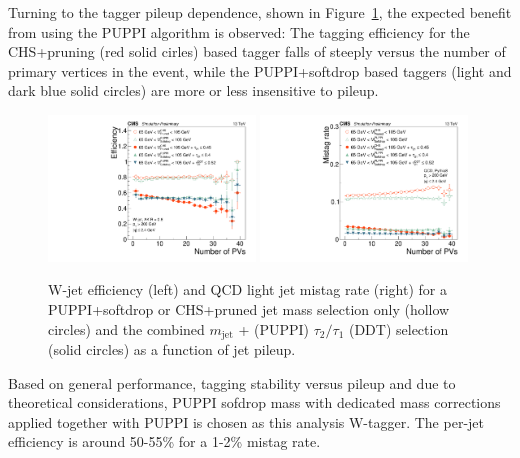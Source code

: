 Turning to the tagger pileup dependence, shown in Figure~\ref{fig:searchII:effvspu}, the expected benefit from using the PUPPI algorithm is observed: The tagging efficiency for the CHS+pruning (red solid cirles) based tagger falls of steeply versus the number of primary vertices in the event, while the PUPPI+softdrop based taggers (light and dark blue solid circles) are more or less insensitive to pileup.
\begin{figure}[h!]
\centering
\includegraphics[width=0.49\textwidth]{figures/vtagging/JME-16-003/BoostedW/WtagSigEffvsNPV.pdf}
\includegraphics[width=0.49\textwidth]{figures/vtagging/JME-16-003/BoostedW/QCDBkgEffvsNPV.pdf}
\caption{W-jet efficiency (left) and QCD light jet mistag rate (right) for a PUPPI+softdrop or CHS+pruned jet mass selection only (hollow circles) and the combined $m_{\mathrm{jet}}$ + (PUPPI) $\tau_2/\tau_1$ (DDT) selection (solid circles) as a function of jet pileup.}
\label{fig:searchII:effvspu}
\end{figure}
Based on general performance, tagging stability versus pileup and due to theoretical considerations, PUPPI sofdrop mass with dedicated mass corrections applied together with PUPPI \nsubj is chosen as this analysis W-tagger. The per-jet efficiency is around 50-55\% for a 1-2\% mistag rate.\par

